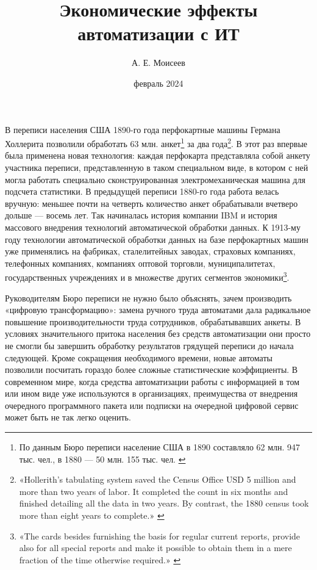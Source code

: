 \documentclass{article}
\title{Экономические эффекты автоматизации с ИТ}
\author{А. Е. Моисеев}
\date{февраль 2024}
\begin{document}
\maketitle

В переписи населения США 1890-го года перфокартные машины Германа Холлерита позволили обработать 63 млн. анкет\footnote{По данным Бюро переписи население США в 1890 составляло 62 млн. 947 тыс. чел., в 1880 — 50 млн. 155 тыс. чел. \cite{usCensus}} за два года\footnote{«Hollerith’s tabulating system saved the Census Office USD 5 million and more than two years of labor. It completed the count in six months and finished detailing all the data in two years. By contrast, the 1880 census took more than eight years to complete.» \cite{ibmPuchCardTabulator}}. В этот раз впервые была применена новая технология: каждая перфокарта представляла собой анкету участника переписи, представленную в таком специальном виде, в котором с ней могла работать специально сконструированная электромеханическая машина для подсчета статистики. В предыдущей переписи 1880-го года работа велась вручную: меньшее почти на четверть количество анкет обрабатывали вчетверо дольше — восемь лет. Так начиналась история компании IBM и история массового внедрения технологий автоматической обработки данных. К 1913-му году технологии автоматической обработки данных на базе перфокартных машин уже применялись на фабриках, сталелитейных заводах, страховых компаниях, телефонных компаниях, компаниях оптовой торговли, муниципалитетах, государственных учреждениях и в множестве других сегментов экономики\footnote{«The cards besides furnishing the basis for regular current reports, provide also for all special reports and make it possible to obtain them in a mere fraction of the time otherwise required.» \cite{machinery1913}}.

Руководителям Бюро переписи не нужно было объяснять, зачем производить «цифровую трансформацию»: замена ручного труда автоматами дала радикальное повышение производительности труда сотрудников, обрабатывавших анкеты. В условиях значительного притока населения без средств автоматизации они просто не смогли бы завершить обработку результатов грядущей переписи до начала следующей. Кроме сокращения необходимого времени, новые автоматы позволили посчитать гораздо более сложные статистические коэффициенты. В современном мире, когда средства автоматизации работы с информацией в том или ином виде уже используются в организациях, преимущества от внедрения очередного программного пакета или подписки на очередной цифровой сервис может быть не так легко оценить.
\end{document}
